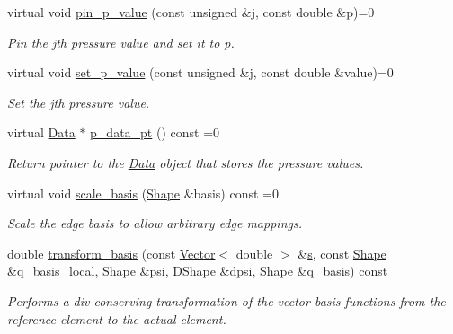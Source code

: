 \begin{DoxyCompactItemize}
virtual void \hyperlink{classoomph_1_1AxisymmetricPoroelasticityEquations_aa38488da8fec869f377a39c5c0da4311}{pin\+\_\+p\+\_\+value} (const unsigned \&j, const double \&p)=0
\begin{DoxyCompactList}\small\item\em Pin the jth pressure value and set it to p. \end{DoxyCompactList}\item 
virtual void \hyperlink{classoomph_1_1AxisymmetricPoroelasticityEquations_a9cd42073dd4fedcb98b578a1edbbb922}{set\+\_\+p\+\_\+value} (const unsigned \&j, const double \&value)=0
\begin{DoxyCompactList}\small\item\em Set the jth pressure value. \end{DoxyCompactList}\item 
virtual \hyperlink{classoomph_1_1Data}{Data} $\ast$ \hyperlink{classoomph_1_1AxisymmetricPoroelasticityEquations_a56e87b385e891d4d5c04e984306c4a27}{p\+\_\+data\+\_\+pt} () const =0
\begin{DoxyCompactList}\small\item\em Return pointer to the \hyperlink{classoomph_1_1Data}{Data} object that stores the pressure values. \end{DoxyCompactList}\item 
virtual void \hyperlink{classoomph_1_1AxisymmetricPoroelasticityEquations_a252e63649ec2c65c1d0b8c7f461a11c6}{scale\+\_\+basis} (\hyperlink{classoomph_1_1Shape}{Shape} \&basis) const =0
\begin{DoxyCompactList}\small\item\em Scale the edge basis to allow arbitrary edge mappings. \end{DoxyCompactList}\item 
double \hyperlink{classoomph_1_1AxisymmetricPoroelasticityEquations_a84c1ab4fd29f23c994a682989af6ca52}{transform\+\_\+basis} (const \hyperlink{classoomph_1_1Vector}{Vector}$<$ double $>$ \&\hyperlink{cfortran_8h_ab7123126e4885ef647dd9c6e3807a21c}{s}, const \hyperlink{classoomph_1_1Shape}{Shape} \&q\+\_\+basis\+\_\+local, \hyperlink{classoomph_1_1Shape}{Shape} \&psi, \hyperlink{classoomph_1_1DShape}{D\+Shape} \&dpsi, \hyperlink{classoomph_1_1Shape}{Shape} \&q\+\_\+basis) const
\begin{DoxyCompactList}\small\item\em Performs a div-\/conserving transformation of the vector basis functions from the reference element to the actual element. \end{DoxyCompactList}\item 

\end{DoxyCompactItemize}

